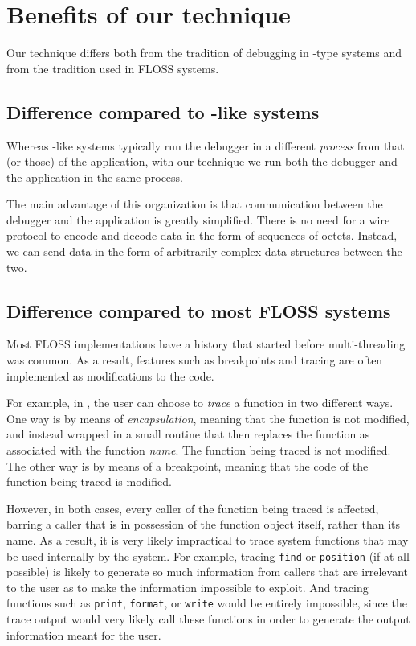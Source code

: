 \section{Benefits of our technique}
\label{sec-benefits}

Our technique differs both from the tradition of debugging in
\unix{}-type systems and from the tradition used in FLOSS
\commonlisp{} systems.

\subsection{Difference compared to \unix{}-like systems}

Whereas \unix{}-like systems typically run the debugger in a different
\emph{process} from that (or those) of the application, with our
technique we run both the debugger and the application in the same
process.

The main advantage of this organization is that communication between
the debugger and the application is greatly simplified.  There is no
need for a wire protocol to encode and decode data in the form of
sequences of octets.  Instead, we can send data in the form of
arbitrarily complex data structures between the two.

\subsection{Difference compared to most FLOSS \commonlisp{} systems}

Most FLOSS \commonlisp{} implementations have a history that started
before multi-threading was common.  As a result, features such as
breakpoints and tracing are often implemented as modifications to
the code.

For example, in \sbcl{}, the user can choose to
\emph{trace} a function in two different ways.  One way is by means of
\emph{encapsulation}, meaning that the function is not modified, and
instead wrapped in a small routine that then replaces the function as
associated with the function \emph{name}.  The function being traced
is not modified.  The other way is by means of a breakpoint, meaning
that the code of the function being traced is modified.

However, in both cases, every caller of the function being traced is
affected, barring a caller that is in possession of the function
object itself, rather than its name.  As a result, it is very likely
impractical to trace system functions that may be used internally by
the system.  For example, tracing \texttt{find} or \texttt{position}
(if at all possible) is likely to generate so much information from
callers that are irrelevant to the user as to make
the information impossible to exploit.  And tracing functions such as
\texttt{print}, \texttt{format}, or \texttt{write} would be entirely
impossible, since the trace output would very likely call these
functions in order to generate the output information meant for the
user.

